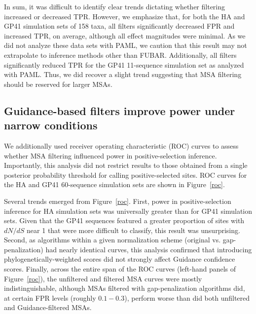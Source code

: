 \documentclass[11pt]{article}
\begin{document}
In sum, it was difficult to identify clear trends dictating whether filtering increased or decreased TPR. However, we emphasize that, for both the HA and GP41 simulation sets of 158 taxa, all filters significantly decreased FPR and increased TPR, on average, although all effect magnitudes were minimal. As we did not analyze these data sets with PAML, we caution that this result may not extrapolate to inference methods other than FUBAR. Additionally, all filters significantly reduced TPR for the GP41 11-sequence simulation set as analyzed with PAML. Thus, we did recover a slight trend suggesting that MSA filtering should be reserved for larger MSAs.

\subsection*{Guidance-based filters improve power under narrow conditions}

We additionally used receiver operating characteristic (ROC) curves to assess whether MSA filtering influenced power in positive-selection inference. Importantly, this analysis did not restrict results to those obtained from a single posterior probability threshold for calling positive-selected sites. ROC curves for the HA and GP41 60-sequence simulation sets are shown in Figure~\ref{roc}. 

Several trends emerged from Figure~\ref{roc}. First, power in positive-selection inference for HA simulation sets was universally greater than for GP41 simulation sets. Given that the GP41 sequences featured a greater proportion of sites with $dN/dS$ near 1 that were more difficult to classify, this result was unsurprising. Second, as algorithms within a given normalization scheme (original vs. gap-penalization) had nearly identical curves, this analysis confirmed that introducing phylogenetically-weighted scores did not strongly affect Guidance confidence scores. Finally, across the entire span of the ROC curves (left-hand panels of Figure~\ref{roc}), the unfiltered and filtered MSA curves were mostly indistinguishable, although MSAs filtered with gap-penalization algorithms did, at certain FPR levels (roughly $0.1-0.3$), perform worse than did both unfiltered and Guidance-filtered MSAs. 
\end{document}
